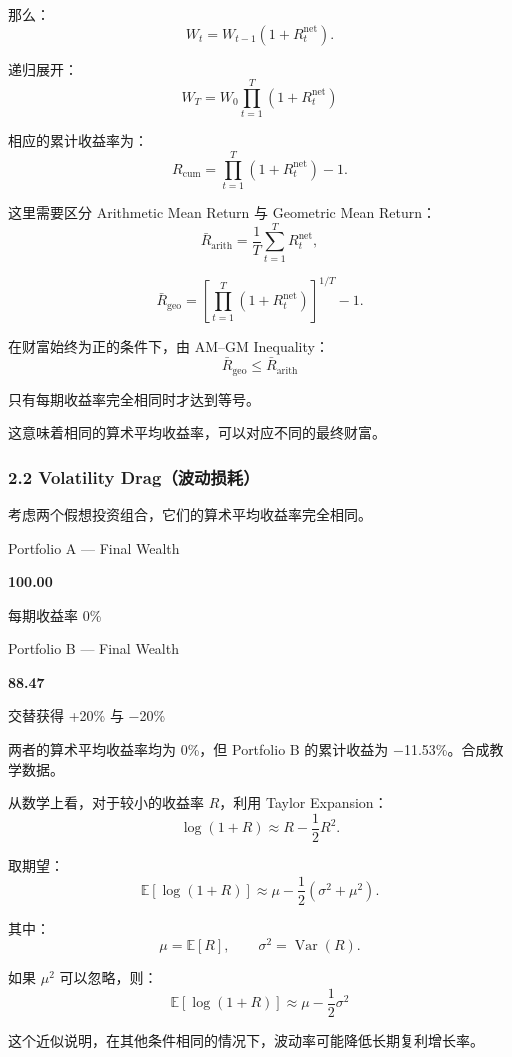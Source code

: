 那么：
\[W_t=W_{t-1}(1+R_t^{\mathrm{net}}).\]

递归展开：
\[\boxed{
W_T=W_0\prod_{t=1}^{T}(1+R_t^{\mathrm{net}})
}\]

相应的累计收益率为：
\[R_{\mathrm{cum}}
=
\prod_{t=1}^{T}(1+R_t^{\mathrm{net}})-1.\]

这里需要区分 Arithmetic Mean Return 与 Geometric Mean Return：
\[\bar R_{\mathrm{arith}}
=
\frac1T\sum_{t=1}^{T}R_t^{\mathrm{net}},\]

\[\bar R_{\mathrm{geo}}
=
\left[
\prod_{t=1}^{T}(1+R_t^{\mathrm{net}})
\right]^{1/T}-1.\]

在财富始终为正的条件下，由 AM--GM Inequality：
\[\boxed{
\bar R_{\mathrm{geo}}
\leq
\bar R_{\mathrm{arith}}
}\]

只有每期收益率完全相同时才达到等号。

这意味着相同的算术平均收益率，可以对应不同的最终财富。

\hypertarget{part-4-67-0001-volatility-dragux6ce2ux52a8ux635fux8017}{%
\subsubsection{2.2 Volatility Drag（波动损耗）}\label{part-4-67-0001-volatility-dragux6ce2ux52a8ux635fux8017}}

考虑两个假想投资组合，它们的算术平均收益率完全相同。


Portfolio A --- Final Wealth

\textbf{100.00}

每期收益率 0\%

Portfolio B --- Final Wealth

\textbf{88.47}

交替获得 +20\% 与 −20\%

两者的算术平均收益率均为 0\%，但 Portfolio B 的累计收益为 −11.53\%。合成教学数据。

从数学上看，对于较小的收益率 \(R\)，利用 Taylor Expansion：
\[\log(1+R)\approx R-\frac12R^2.\]

取期望：
\[\mathbb E[\log(1+R)]
\approx
\mu-\frac12(\sigma^2+\mu^2).\]

其中：
\[\mu=\mathbb E[R],
\qquad
\sigma^2=\operatorname{Var}(R).\]

如果 \(\mu^2\) 可以忽略，则：
\[\boxed{
\mathbb E[\log(1+R)]
\approx
\mu-\frac12\sigma^2
}\]

这个近似说明，在其他条件相同的情况下，波动率可能降低长期复利增长率。

